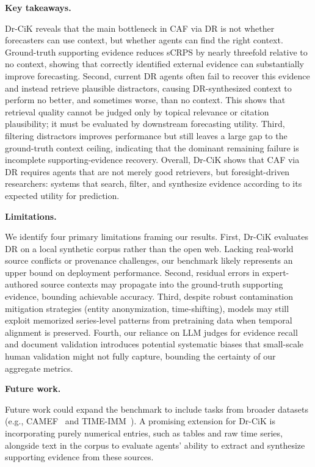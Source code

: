 \documentclass[]{servicenow}
\newcommand{\paragraphtight}[1]{%
  \par\vspace{-0.75\parskip}\vspace{0.3em}%
  \noindent\textbf{#1}\hspace{0.4em}\ignorespaces
}
\begin{document}
\paragraphtight{Key takeaways.}
Dr-CiK reveals that the main bottleneck in CAF via DR is not whether forecasters can use context, but whether agents can find the right context. Ground-truth supporting evidence reduces sCRPS by nearly threefold relative to no context, showing that correctly identified external evidence can substantially improve forecasting. 
Second, current DR agents often fail to recover this evidence and instead retrieve plausible distractors, causing DR-synthesized context to perform no better, and sometimes worse, than no context. This shows that retrieval quality cannot be judged only by topical relevance or citation plausibility; it must be evaluated by downstream forecasting utility. Third, filtering distractors improves performance but still leaves a large gap to the ground-truth context ceiling, indicating that the dominant remaining failure is incomplete supporting-evidence recovery. Overall, Dr-CiK shows that CAF via DR requires agents that are not merely good retrievers, but foresight-driven researchers: systems that search, filter, and synthesize evidence according to its expected utility for prediction.



\paragraphtight{Limitations.}
We identify four primary limitations framing our results.
First, Dr-CiK evaluates DR on a local synthetic corpus rather than the open web. Lacking real-world source conflicts or provenance challenges, our benchmark likely represents an upper bound on deployment performance.
Second, residual errors in expert-authored source contexts may propagate into the ground-truth supporting evidence, bounding achievable accuracy.
Third, despite robust contamination mitigation strategies (entity anonymization, time-shifting), models may still exploit memorized series-level patterns from pretraining data when temporal alignment is preserved.
Fourth, our reliance on LLM judges for evidence recall and document validation introduces potential systematic biases that small-scale human validation might not fully capture, bounding the certainty of our aggregate metrics.


\paragraphtight{Future work.}
Future work could expand the benchmark to include tasks from broader datasets (e.g., CAMEF~\citep{zhang2025camef} and TIME-IMM~\citep{chang2025time}). 
A promising extension for Dr-CiK is incorporating purely numerical entries, such as tables and raw time series, alongside text in the corpus to evaluate agents' ability to extract and synthesize supporting evidence from these sources.
\end{document}
